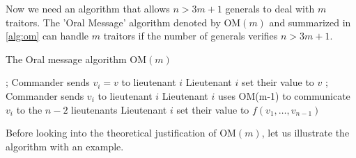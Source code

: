 Now we need an algorithm that allows $n>3m+1$ generals to deal with $m$ traitors. The 'Oral Message' algorithm denoted by $\text{OM}(m)$ and summarized in \cref{alg:om} can handle $m$ traitors if the number of generals verifies $n>3m+1$.
\begin{algorithm}[!ht]
\caption{The Oral message algorithm $\text{OM}(m)$}\label{alg:om}
\begin{algorithmic}[1]
;
\State Commander sends $v_i = v$ to lieutenant $i$ 
\State Lieutenant $i$ set their value to $v$
\EndFor
\EndIf
{};
\State Commander sends $v_i$ to lieutenant $i$ 
\State Lieutenant $i$ uses OM(m-1) to communicate $v_i$ to the $n-2$ lieutenants
\EndFor
{} 
\State Lieutenant $i$ set their value to $f(v_1, \ldots, v_{n-1})$
\EndFor
\EndIf
\end{algorithmic}
\end{algorithm}
Before looking into the theoretical justification of $\text{OM}(m)$, let us illustrate the algorithm with an example.
